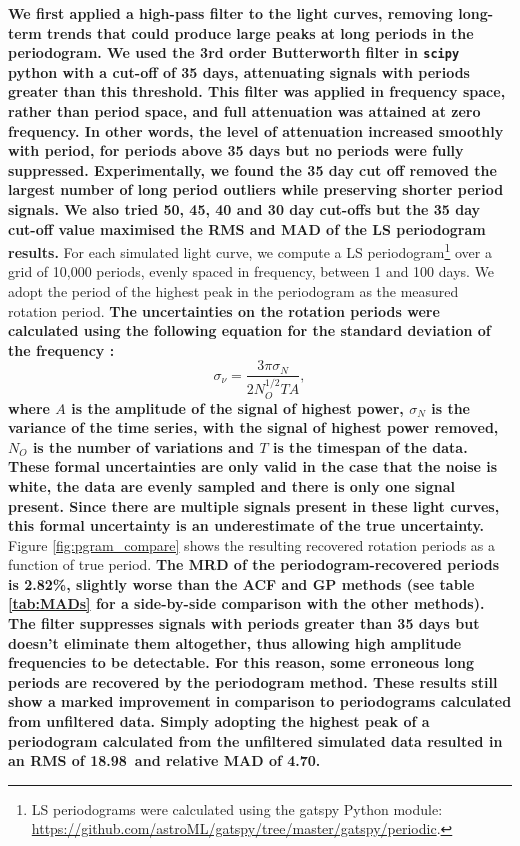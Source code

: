 \documentclass[a4paper,fleqn,usenatbib,useAMS]{mnras}
\newcommand{\oldpgramRMS}{18.98}
\newcommand{\oldpercentpgramMAD}{4.70}
\newcommand{\percentpgramMAD}{2.82}
\begin{document}
{\bf We first applied a high-pass filter to the light curves, removing
long-term trends that could produce large peaks at long periods in the
periodogram.
We used the 3rd order Butterworth filter in {\tt scipy} python with a cut-off
of 35 days, attenuating signals with periods greater than this threshold.
This filter was applied in frequency space, rather than period space, and full
attenuation was attained at zero frequency.
In other words, the level of attenuation increased smoothly with period, for
periods above 35 days but no periods were fully suppressed.
Experimentally, we found the 35 day cut off removed the largest number of long
period outliers while preserving shorter period signals.
We also tried 50, 45, 40 and 30 day cut-offs but the 35 day cut-off value
maximised the RMS and MAD of the LS periodogram results.}
For each simulated light curve, we compute a LS periodogram\footnote{LS
periodograms were calculated using the gatspy Python module:
\url{https://github.com/astroML/gatspy/tree/master/gatspy/periodic}.} over a
grid of 10,000 periods, evenly spaced in frequency, between 1 and 100 days.
We adopt the period of the highest peak in the periodogram as the measured
rotation period.
{\bf The uncertainties on the rotation periods were calculated using the
following equation for the standard deviation of the frequency
\citep{Horne1986, Kovacs1981}:
\begin{equation}
    \sigma_{\nu} = \frac{3\pi\sigma_N}{2N_O^{1/2}TA},
\end{equation}
where $A$ is the amplitude of the signal of highest power, $\sigma_N$ is the
variance of the time series, with the signal of highest power removed, $N_O$
is the number of variations and $T$ is the timespan of the data.
These formal uncertainties are only valid in the case that the noise is white,
the data are evenly sampled and there is only one signal present.
Since there are multiple signals present in these light curves, this formal
uncertainty is an underestimate of the true uncertainty.
}
Figure \ref{fig:pgram_compare} shows the resulting recovered rotation periods
as a function of true period.
{\bf The MRD of the periodogram-recovered periods is \percentpgramMAD\%,
slightly worse than the ACF and GP methods (see table \ref{tab:MADs} for
a side-by-side comparison with the other methods).
The filter suppresses signals with periods greater than 35 days but doesn't
eliminate them altogether, thus allowing high amplitude frequencies to be
detectable.
For this reason, some erroneous long periods are recovered by the periodogram
method.
These results still show a marked improvement in comparison to periodograms
calculated from unfiltered data.
Simply adopting the highest peak of a periodogram calculated from the
unfiltered simulated data resulted in an RMS of \oldpgramRMS\ and relative MAD
of \oldpercentpgramMAD.}
\end{document}
